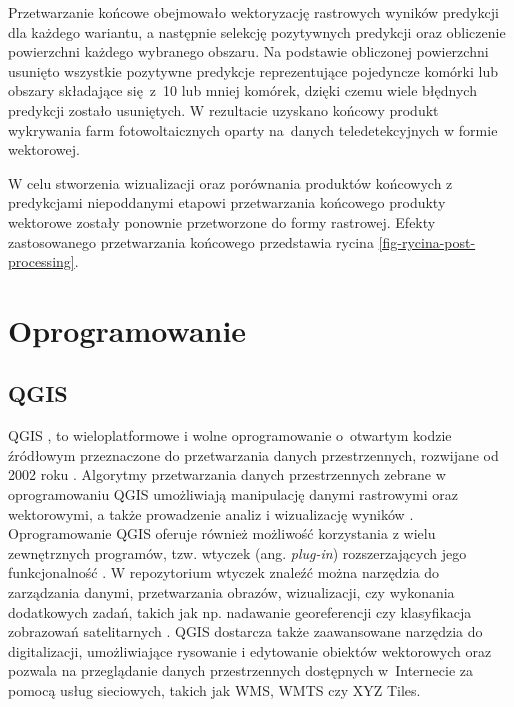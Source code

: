 \documentclass{amuthesis}
\begin{document}
Przetwarzanie końcowe obejmowało wektoryzację rastrowych wyników
predykcji dla każdego wariantu, a następnie selekcję pozytywnych
predykcji oraz obliczenie powierzchni każdego wybranego obszaru. Na
podstawie obliczonej powierzchni usunięto wszystkie pozytywne predykcje
reprezentujące pojedyncze komórki lub obszary składające się~z~10 lub
mniej komórek, dzięki czemu wiele błędnych predykcji zostało usuniętych.
W rezultacie uzyskano końcowy produkt wykrywania farm fotowoltaicznych
oparty na~danych teledetekcyjnych w formie wektorowej.

W celu stworzenia wizualizacji oraz porównania produktów końcowych z
predykcjami niepoddanymi etapowi przetwarzania końcowego produkty
wektorowe zostały ponownie przetworzone do formy rastrowej. Efekty
zastosowanego przetwarzania końcowego przedstawia rycina
\ref{fig-rycina-post-processing}.

\hypertarget{oprogramowanie}{%
\section{Oprogramowanie}\label{oprogramowanie}}

\hypertarget{qgis}{%
\subsection{QGIS}\label{qgis}}

QGIS \autocite{qgis}, to wieloplatformowe i wolne oprogramowanie
o~otwartym kodzie źródłowym przeznaczone do przetwarzania danych
przestrzennych, rozwijane od 2002 roku
\autocite{hejmanowska_2020_dane,flenniken_2020_qgis}. Algorytmy
przetwarzania danych przestrzennych zebrane w oprogramowaniu QGIS
umożliwiają manipulację danymi rastrowymi oraz wektorowymi, a także
prowadzenie analiz i wizualizację wyników
\autocite{hejmanowska_2020_dane}. Oprogramowanie QGIS oferuje również
możliwość korzystania z wielu zewnętrznych programów, tzw. wtyczek (ang.
\emph{plug-in}) rozszerzających jego funkcjonalność
\autocite{hejmanowska_2020_dane}. W repozytorium wtyczek znaleźć można
narzędzia do zarządzania danymi, przetwarzania obrazów, wizualizacji,
czy wykonania dodatkowych zadań, takich jak np. nadawanie georeferencji
czy klasyfikacja zobrazowań satelitarnych
\autocite{hejmanowska_2020_dane}. QGIS dostarcza także zaawansowane
narzędzia do digitalizacji, umożliwiające rysowanie i edytowanie
obiektów wektorowych oraz pozwala na przeglądanie danych przestrzennych
dostępnych w~Internecie za pomocą usług sieciowych, takich jak WMS, WMTS
czy XYZ Tiles.
\end{document}
